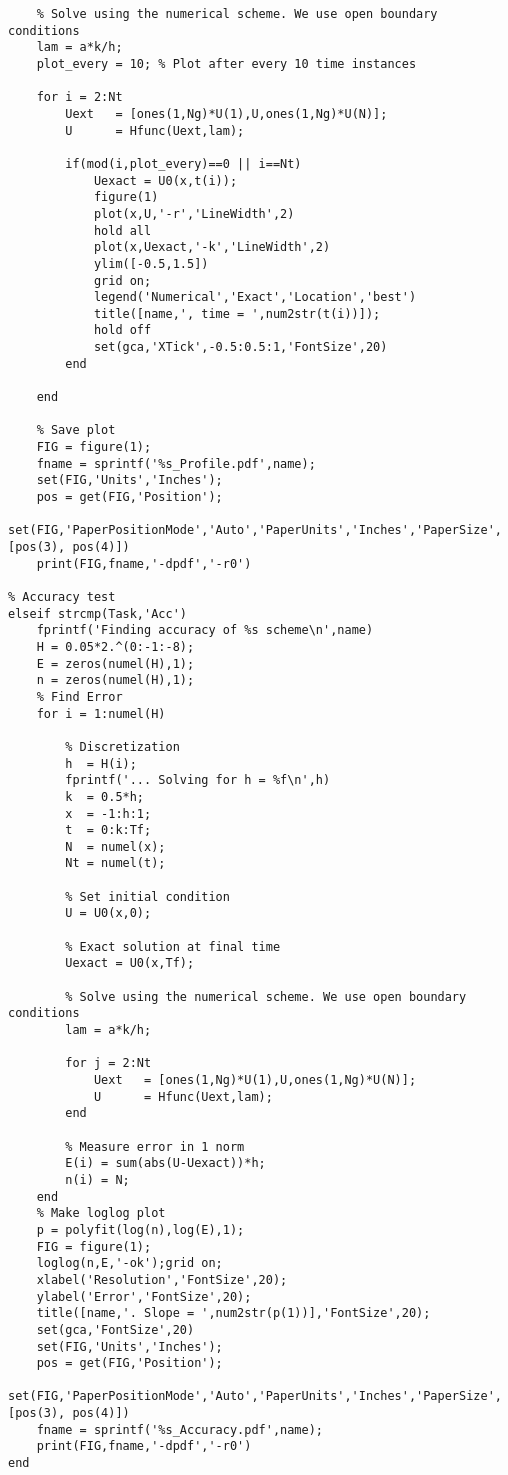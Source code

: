 \documentclass{article}
\begin{document}
\begin{exerciseList}
\begin{lstlisting}
    % Solve using the numerical scheme. We use open boundary conditions
    lam = a*k/h;
    plot_every = 10; % Plot after every 10 time instances
    
    for i = 2:Nt
        Uext   = [ones(1,Ng)*U(1),U,ones(1,Ng)*U(N)];
        U      = Hfunc(Uext,lam);
        
        if(mod(i,plot_every)==0 || i==Nt)
            Uexact = U0(x,t(i));
            figure(1)
            plot(x,U,'-r','LineWidth',2)
            hold all
            plot(x,Uexact,'-k','LineWidth',2)
            ylim([-0.5,1.5])
            grid on;
            legend('Numerical','Exact','Location','best')
            title([name,', time = ',num2str(t(i))]);
            hold off
            set(gca,'XTick',-0.5:0.5:1,'FontSize',20)
        end
        
    end
    
    % Save plot
    FIG = figure(1);
    fname = sprintf('%s_Profile.pdf',name);
    set(FIG,'Units','Inches');
    pos = get(FIG,'Position');
    set(FIG,'PaperPositionMode','Auto','PaperUnits','Inches','PaperSize',[pos(3), pos(4)])
    print(FIG,fname,'-dpdf','-r0')
    
% Accuracy test
elseif strcmp(Task,'Acc')
    fprintf('Finding accuracy of %s scheme\n',name)
    H = 0.05*2.^(0:-1:-8);
    E = zeros(numel(H),1);
    n = zeros(numel(H),1);
    % Find Error
    for i = 1:numel(H)
        
        % Discretization
        h  = H(i);
        fprintf('... Solving for h = %f\n',h)
        k  = 0.5*h;
        x  = -1:h:1;
        t  = 0:k:Tf;
        N  = numel(x);
        Nt = numel(t);
        
        % Set initial condition
        U = U0(x,0);
        
        % Exact solution at final time
        Uexact = U0(x,Tf);
        
        % Solve using the numerical scheme. We use open boundary conditions
        lam = a*k/h;
        
        for j = 2:Nt
            Uext   = [ones(1,Ng)*U(1),U,ones(1,Ng)*U(N)];
            U      = Hfunc(Uext,lam);
        end
        
        % Measure error in 1 norm
        E(i) = sum(abs(U-Uexact))*h;
        n(i) = N;
    end
    % Make loglog plot
    p = polyfit(log(n),log(E),1);
    FIG = figure(1);
    loglog(n,E,'-ok');grid on;
    xlabel('Resolution','FontSize',20);
    ylabel('Error','FontSize',20);
    title([name,'. Slope = ',num2str(p(1))],'FontSize',20);
    set(gca,'FontSize',20)
    set(FIG,'Units','Inches');
    pos = get(FIG,'Position');
    set(FIG,'PaperPositionMode','Auto','PaperUnits','Inches','PaperSize',[pos(3), pos(4)])
    fname = sprintf('%s_Accuracy.pdf',name);
    print(FIG,fname,'-dpdf','-r0')
end







\end{lstlisting}

\end{exerciseList}
\end{document}
